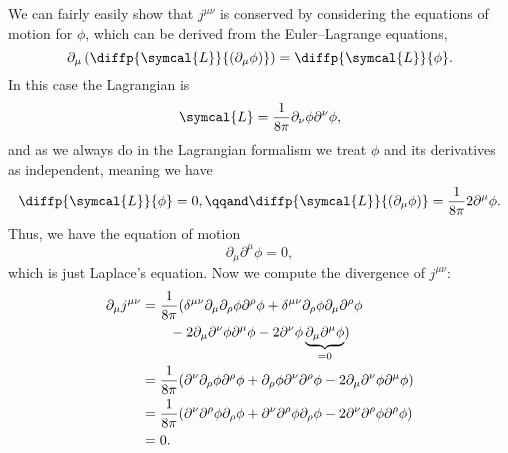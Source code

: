 \documentclass[fleqn]{NotesClass}
\newcommand{\lagrangian}{\symcal{L}}
\begin{document}
\begin{exm}{}{}
        We can fairly easily show that \(j^{\mu\nu}\) is conserved by considering the equations of motion for \(\phi\), which can be derived from the Euler--Lagrange equations,
        \begin{equation}
            \partial_\mu\left( \diffp{\lagrangian}{(\partial_\mu \phi)} \right) = \diffp{\lagrangian}{\phi}.
        \end{equation}
        In this case the Lagrangian is
        \begin{equation}
            \lagrangian = \frac{1}{8\pi} \partial_\nu \phi \partial^\nu \phi,
        \end{equation}
        and as we always do in the Lagrangian formalism we treat \(\phi\) and its derivatives as independent, meaning we have
        \begin{equation}
            \diffp{\lagrangian}{\phi} = 0, \qqand \diffp{\lagrangian}{(\partial_\mu \phi)} = \frac{1}{8\pi}2\partial^\mu \phi.
        \end{equation}
        Thus, we have the equation of motion
        \begin{equation}
            \partial_\mu \partial^\mu \phi = 0,
        \end{equation}
        which is just Laplace's equation.
        Now we compute the divergence of \(j^{\mu\nu}\):
        \begin{align}
            \partial_\mu j^{\mu\nu} &= \frac{1}{8\pi} (\delta^{\mu\nu} \partial_\mu \partial_\rho \phi \partial^\rho \phi + \delta^{\mu\nu} \partial_\rho \phi \partial_\mu \partial^\rho \phi \notag\\
            &\qquad - 2 \partial_\mu \partial^\nu \phi \partial^\mu \phi - 2\partial^\nu \phi \underbrace{\partial_\mu \partial^\mu \phi}_{=0})\\
            &= \frac{1}{8\pi}(\partial^\nu \partial_\rho\phi \partial^\rho\phi + \partial_\rho \phi \partial^\nu \partial^\rho \phi - 2\partial_\mu \partial^\nu \phi \partial^\mu \phi)\\
            &= \frac{1}{8\pi}(\partial^\nu \partial^\rho \phi \partial_\rho \phi + \partial^\nu \partial^\rho\phi \partial_\rho\phi - 2\partial^\nu \partial^\rho \phi \partial^\rho\phi)\\
            &= 0.
        \end{align}
    \end{exm}
    
\end{document}
